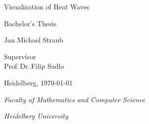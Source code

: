 
\begin{titlepage}
  \centering %
  \vspace*{\baselineskip} %


  {\huge Visualization of Heat Waves}\\[0.2\baselineskip] %


  \vspace*{\baselineskip}

  {\Large Bachelor's Thesis\\[\baselineskip]} %
  \vspace*{\baselineskip}

  {\LARGE Jan Michael Straub\\[\baselineskip]} %

  \vspace*{\baselineskip} %

  Supervisor\\
  {\large  Prof.\,Dr.\,Filip Sadlo\\[\baselineskip]} %

  \vfil

  Heidelberg,  \today \par %

  \vspace*{\baselineskip}

  {\itshape Faculty of Mathematics and Computer Science\par} %
  {\itshape Heidelberg University\par} %
\end{titlepage}

\cleardoublepage
